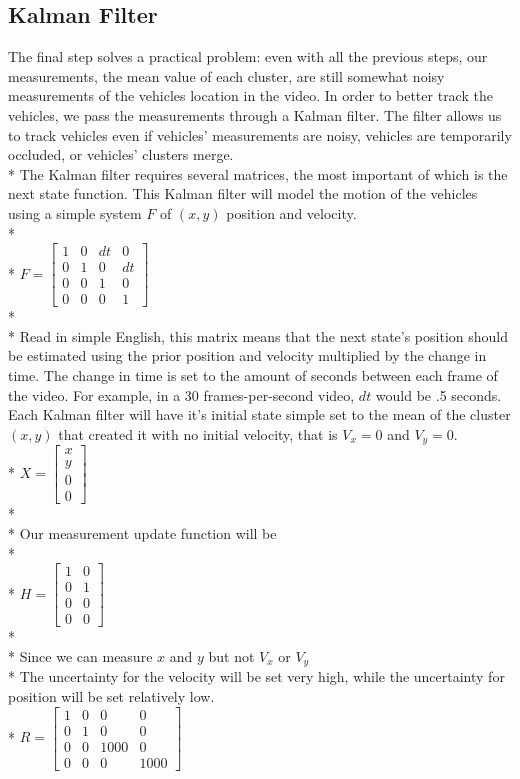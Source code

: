 \documentclass{article} %
\begin{document}
\subsection{Kalman Filter}
The final step solves a practical problem: even with all the previous steps, our measurements, the mean value of each cluster, are still somewhat noisy measurements of the vehicles location in the video. In order to better track the vehicles, we pass the measurements through a Kalman filter. The filter allows us to track vehicles even if vehicles' measurements are noisy, vehicles are temporarily occluded, or vehicles' clusters merge. \\*
The Kalman filter requires several matrices, the most important of which is the next state function. This Kalman filter will model the motion of the vehicles using a simple system $F$ of $(x,y)$ position and velocity. \\*
\\*
$F = \begin{bmatrix}
1 & 0 & dt & 0\\
0 & 1 & 0 & dt\\
0 & 0 & 1 & 0\\
0 & 0 & 0 & 1\end{bmatrix}$\\*\\*
Read in simple English, this matrix means that the next state's position should be estimated using the prior position and velocity multiplied by the change in time. The change in time is set to the amount of seconds between each frame of the video. For example, in a 30 frames-per-second video, $dt$ would be .5 seconds.
Each Kalman filter will have it's initial state simple set to the mean of the cluster $(x,y)$ that created it with no initial velocity, that is $V_x = 0$ and $V_y = 0$.\\*
$X = \begin{bmatrix}
x \\
y \\
0 \\
0 \end{bmatrix}$\\*\\*
Our measurement update function will be \\*\\*
$H = \begin{bmatrix}
1 & 0 \\
0 & 1 \\
0 & 0 \\
0 & 0 \end{bmatrix}$\\*\\*
Since we can measure $x$ and $y$ but not $V_x$ or $V_y$\\*
The uncertainty for the velocity will be set very high, while the uncertainty for position will be set relatively low.\\*
$R = \begin{bmatrix}
 1 & 0 & 0 & 0\\
 0 & 1 & 0 & 0\\
 0 & 0 & 1000 & 0\\
 0 & 0 & 0 & 1000\end{bmatrix}$
\end{document}
